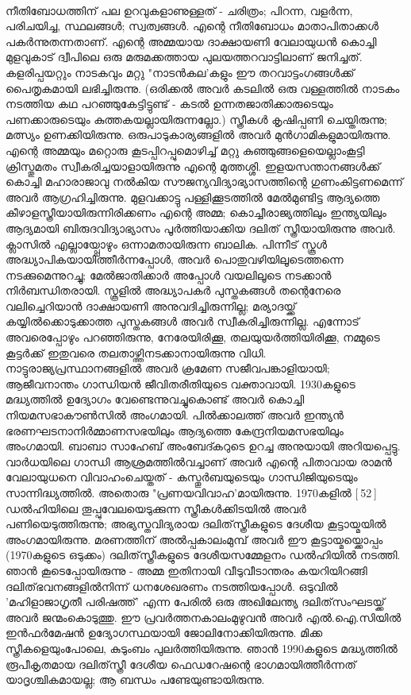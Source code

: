 \paragraph{}

നീതിബോധത്തിന് പല ഉറവുകളാണുള്ളത് - ചരിത്രം; പിറന്ന, വളർന്ന, പരിചയിച്ച, സ്ഥലങ്ങൾ; സ്വത്വങ്ങൾ. എന്റെ നീതിബോധം മാതാപിതാക്കൾ പകർന്നുതന്നതാണ്. എന്റെ അമ്മയായ ദാക്ഷായണി വേലായുധൻ കൊച്ചി മുളവുകാട് ദ്വീപിലെ ഒരു മരുമക്കത്തായ പുലയത്തറവാട്ടിലാണ് ജനിച്ചത്. കളരിപ്പയറ്റും നാടകവും മറ്റു "നാടൻകല'കളും ഈ തറവാട്ടംഗങ്ങൾക്ക് പൈതൃകമായി ലഭിച്ചിരുന്നു. (ഒരിക്കൽ അവർ കടലിൽ ഒരു വള്ളത്തിൽ നാടകം നടത്തിയ കഥ പറഞ്ഞുകേട്ടിട്ടുണ്ട് - കടൽ ഉന്നതജാതിക്കാരുടെയും പണക്കാരുടെയും കുത്തകയല്ലായിരുന്നല്ലോ.) സ്ത്രീകൾ കൃഷിപ്പണി ചെയ്തിരുന്നു; മത്സ്യം ഉണക്കിയിരുന്നു. ഒരുപാടുകാര്യങ്ങളിൽ അവർ മുൻഗാമികളുമായിരുന്നു. എന്റെ അമ്മയും മറ്റൊരു കൂടപ്പിറപ്പുമൊഴിച്ച് മറ്റു കുഞ്ഞുങ്ങളെയെല്ലാംകൂട്ടി ക്രിസ്തുമതം സ്വീകരിച്ചയാളായിരുന്നു എന്റെ മുത്തശ്ശി. ഇളയസന്താനങ്ങൾക്ക് കൊച്ചി മഹാരാജാവു നൽകിയ സൗജന്യവിദ്യാഭ്യാസത്തിന്റെ ഗുണംകിട്ടണമെന്ന് അവർ ആഗ്രഹിച്ചിരുന്നു. മുളവക്കാട്ടു പള്ളിക്കൂടത്തിൽ മേൽമുണ്ടിട്ട ആദ്യത്തെ കീഴാളസ്ത്രീയായിരുന്നിരിക്കണം എന്റെ അമ്മ; കൊച്ചീരാജ്യത്തിലും ഇന്ത്യയിലും ആദ്യമായി ബിരുദവിദ്യാഭ്യാസം പൂർത്തിയാക്കിയ ദലിത് സ്ത്രീയായിരുന്നു അവർ. ക്ലാസിൽ എല്ലായ്പ്പോഴും ഒന്നാമതായിരുന്ന ബാലിക. പിന്നീട് സ്കൂൾ അദ്ധ്യാപികയായിത്തീർന്നപ്പോൾ, അവർ പൊതുവഴിയിലൂടെത്തന്നെ നടക്കുമെന്നുറച്ചു; മേൽജാതിക്കാർ അപ്പോൾ വയലിലൂടെ നടക്കാൻ നിർബന്ധിതരായി. സ്കൂളിൽ അദ്ധ്യാപകർ പുസ്തകങ്ങൾ തന്റെനേരെ വലിച്ചെറിയാൻ ദാക്ഷായണി അനുവദിച്ചിരുന്നില്ല; മര്യാദയ്ക്ക് കയ്യിൽക്കൊടുക്കാത്ത പുസ്തകങ്ങൾ അവർ സ്വീകരിച്ചിരുന്നില്ല. എന്നോട് അവരെപ്പോഴും പറഞ്ഞിരുന്നു, നേരേയിരിക്കൂ, തലയുയർത്തിയിരിക്കൂ, നമ്മുടെ കൂട്ടർക്ക് ഇതുവരെ തലതാഴ്ത്തിനടക്കാനായിരുന്നു വിധി. നാട്ടുരാജ്യപ്രസ്ഥാനങ്ങളിൽ അവർ ക്രമേണ സജീവപങ്കാളിയായി; ആജീവനാന്തം ഗാന്ധിയൻ ജീവിതരീതിയുടെ വക്താവായി. 1930കളുടെ മദ്ധ്യത്തിൽ ഉദ്യോഗം വേണ്ടെന്നുവച്ചുകൊണ്ട് അവർ കൊച്ചി നിയമസഭാകൗൺസിൽ അംഗമായി. പിൽക്കാലത്ത് അവർ ഇന്ത്യൻ ഭരണഘടനാനിർമ്മാണസഭയിലും ആദ്യത്തെ കേന്ദ്രനിയമസഭയിലും അംഗമായി. ബാബാ സാഹേബ് അംബേദ്കറുടെ ഉറച്ച അനുയായി അറിയപ്പെട്ടു. വാർധയിലെ ഗാന്ധി ആശ്രമത്തിൽവച്ചാണ് അവർ എന്റെ പിതാവായ രാമൻ വേലായുധനെ വിവാഹംചെയ്തത് - കസ്തൂർബയുടെയും ഗാന്ധിജിയുടെയും സാന്നിദ്ധ്യത്തിൽ. അതൊരു "പ്രണയവിവാഹ'മായിരുന്നു. 1970കളിൽ [ 52 ] ഡൽഹിയിലെ തൂപ്പുവേലയെടുക്കുന്ന സ്ത്രീകൾക്കിടയിൽ അവർ പണിയെടുത്തിരുന്നു; അഭ്യസ്തവിദ്യരായ ദലിത്‌സ്ത്രീകളുടെ ദേശീയ കൂട്ടായ്മയിൽ അംഗമായിരുന്നു. മരണത്തിന് അൽപ്പകാലംമുമ്പ് അവർ ഈ കൂട്ടായ്മയ്ക്കൊപ്പം (1970കളുടെ ഒടുക്കം) ദലിത്‌സ്ത്രീകളുടെ ദേശീയസമ്മേളനം ഡൽഹിയിൽ നടത്തി. ഞാൻ കൂടെപ്പോയിരുന്നു - അമ്മ ഇതിനായി വീടുവീടാന്തരം കയറിയിറങ്ങി ദലിത്‌ഭവനങ്ങളിൽനിന്ന് ധനശേഖരണം നടത്തിയപ്പോൾ. ഒടുവിൽ 'മഹിളാജാഗൃതീ പരിഷത്ത്' എന്ന പേരിൽ ഒരു അഖിലേന്ത്യ ദലിത്‌സംഘടയ്ക്ക് അവർ ജന്മംകൊടുത്തു. ഈ പ്രവർത്തനകാലംമുഴുവൻ അവർ എൽ.ഐ.സിയിൽ ഇൻഫർമേഷൻ ഉദ്യോഗസ്ഥയായി ജോലിനോക്കിയിരുന്നു. മിക്ക സ്ത്രീകളെയുംപോലെ, കുടുംബം പുലർത്തിയിരുന്നു. ഞാൻ 1990കളുടെ മദ്ധ്യത്തിൽ രൂപീകൃതമായ ദലിത്‌സ്ത്രീ ദേശീയ ഫെഡറേഷന്റെ ഭാഗമായിത്തീർന്നത് യാദൃശ്ചികമായല്ല; ആ ബന്ധം പണ്ടേയുണ്ടായിരുന്നു.
